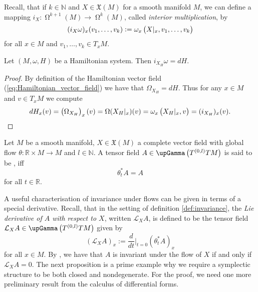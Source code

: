 Recall, that if $k \in \mathbb{N}$ and $X \in \mathfrak{X}(M)$ for a smooth manifold $M$, we can define a mapping $i_X : \upOmega^{k + 1}(M) \to \upOmega^k(M)$, called \emph{interior multiplication}, by
\begin{equation*}
	(i_X\omega)_x(v_1,\dots,v_k) := \omega_x\del[1]{X\vert_x,v_1,\dots,v_k}
\end{equation*}
\noindent for all $x \in M$ and $v_1,\dots,v_k \in T_xM$.

\begin{lemma}
	\label{lem:interior_multiplication_Hamiltonian_vector_field}
	Let $(M,\omega,H)$ be a Hamiltonian system. Then $i_{X_H}\omega = dH$.
\end{lemma}

\begin{proof}
	By definition of the Hamiltonian vector field (\ref{eq:Hamiltonian_vector_field}) we have that $\Omega_{X_H} = dH$. Thus for any $x \in M$ and $v \in T_xM$ we compute
	\begin{equation*}
		dH_x(v) = \del[1]{\Omega_{X_H}}_x(v) = \Omega(X_H\vert_x)(v) = \omega_x\del[1]{X_H\vert_x,v} = (i_{X_H})_x(v). 
	\end{equation*}
\end{proof}

\begin{definition}[Invariance]
	\label{def:invariance}
	Let $M$ be a smooth manifold, $X \in \mathfrak{X}(M)$ a complete vector field with global flow $\theta : \mathbb{R} \times M \to M$ and $l \in \mathbb{N}$. A tensor field $A \in \upGamma\del[1]{T^{(0,l)}TM}$ is said to be , iff
	\begin{equation*}
		\theta_t^*A = A
	\end{equation*}
	\noindent for all $t \in \mathbb{R}$.
\end{definition}

A useful characterisation of invariance under flows can be given in terms of a special derivative. Recall, that in the setting of definition \ref{def:invariance}, the \emph{Lie derivative of $A$ with respect to $X$}, written $\mathcal{L}_XA$, is defined to be the tensor field $\mathcal{L}_XA \in \upGamma\del[1]{T^{(0,l)}TM}$ given by
\begin{equation*}
	(\mathcal{L}_XA)_x := \frac{d}{dt}\bigg\vert_{t = 0}(\theta^*_tA)_x
\end{equation*}
\noindent for all $x \in M$. By \cite[324]{lee:smooth_manifolds:2013}, we have that $A$ is invariant under the flow of $X$ if and only if $\mathcal{L}_XA = 0$. The next proposition is a prime example why we require a symplectic structure to be both closed and nondegenerate. For the proof, we need one more preliminary result from the calculus of differential forms.

